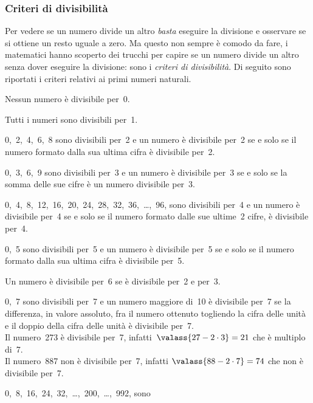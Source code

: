 
\subsubsection{Criteri di divisibilità}
\label{subsec:nat_criteridivisibilita}

Per vedere se un numero divide un altro \emph{basta} eseguire la 
divisione e osservare se si ottiene un resto uguale a zero. 
Ma questo non sempre è comodo da fare, i matematici hanno scoperto dei
trucchi per capire se un numero divide un altro senza dover eseguire 
la divisione: sono i \emph{criteri di divisibilità}. 
Di seguito sono riportati i criteri relativi ai primi numeri naturali.

\begin{description} [noitemsep]
\item[\textbf{0}:~] Nessun numero è divisibile per~0.
\item[\textbf{1}:~] Tutti i numeri sono divisibili per~1.
\item[\textbf{2}:~] 0,~2,~4,~6,~8 sono divisibili per~2 
e un numero è divisibile per~2 se e solo se il numero formato dalla sua 
ultima cifra è divisibile per~2.
\item[\textbf{3}:~]
0,~3,~6,~9 sono divisibili per~3 
e un numero è divisibile per~3 se e solo se la somma delle sue cifre è un 
numero divisibile per~3.
\item[\textbf{4}:~] 0,~4,~8,~12,~16,~20,~24,~28,~32,~36,~\dots,~96,
sono divisibili per~4 
e un numero è divisibile per~4 se e solo se il numero formato dalle sue 
ultime~2 cifre, è divisibile per~4.
\item[\textbf{5}:~] 0,~5 sono divisibili per~5 
e un numero è divisibile per~5 se e solo se il numero formato dalla sua 
ultima cifra è divisibile per~5.
\item[\textbf{6}:~] Un numero è divisibile per~6 se è divisibile 
per~2 e per~3.
\item[\textbf{7}:~] 0,~7 sono divisibili per~7 
e un numero maggiore di~10 è divisibile per~7 se la differenza, 
in valore assoluto, fra il numero ottenuto togliendo la cifra delle unità 
e il doppio della cifra delle unità è divisibile per~7.\\
Il numero~273 è divisibile per~7, infatti~\( \valass{27 -2 \cdot 3} = 21\) 
che è multiplo di~7.\\
Il numero~887 non è divisibile per~7, infatti 
\(\valass{88 -2 \cdot 7}= 74\) che non è divisibile per~7.
\item[\textbf{8}:~] 0,~8,~16,~24,~32,~\dots,~200,~\dots,~992, sono 

\end{description}

